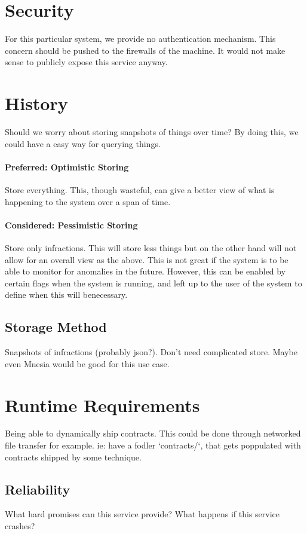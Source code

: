 \documentclass[12pt,twoside]{article}
\begin{document}
\section{Security}
For this particular system, we provide no authentication
mechanism. This concern should be pushed to the firewalls of the
machine. It would not make sense to publicly expose this service
anyway.

\section{History}
Should we worry about storing snapshots of things over time? By
doing this, we could have a easy way for querying things.

\paragraph{Preferred: Optimistic Storing}
Store everything. This, though wasteful, can give a better view of
what is happening to the system over a span of time.

\paragraph{Considered: Pessimistic Storing}
Store only infractions. This will store less things but on the
other hand will not allow for an overall view as the above. This is
not great if the system is to be able to monitor for anomalies in the
future. However, this can be enabled by certain flags when the system
is running, and left up to the user of the system to define when this
will benecessary.

\subsection{Storage Method}
Snapshots of infractions (probably json?). Don't need complicated
store. Maybe even Mnesia would be good for this use case.

\section{Runtime Requirements}
Being able to dynamically ship contracts. This could be done
through networked file transfer for example. ie: have a fodler
`contracts/`, that gets poppulated with contracts shipped by some
technique.

\subsection{Reliability}
What hard promises can this service provide?
What happens if this service crashes?
\end{document}
